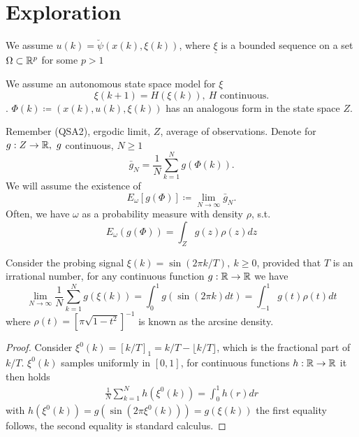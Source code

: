 
\section{Exploration}

We assume \(u(k)=\breve{\psi}(x(k),\xi(k))\), where \(\underline{\xi}\) is a 
bounded sequence on a set \(\Omega\subset \mathbb{R}^p\) for some \(p>1\)

We assume an autonomous state space model for \(\xi\) 
\[\xi(k+1)=H(\xi(k)),\ H \text{ continuous}.\].
\(\Phi(k)\coloneqq(x(k),u(k),\xi(k))\) has an analogous form in the state space \(Z\).

Remember (QSA2), ergodic limit, \(Z\), average of observations. Denote for 
\(g:Z\to\mathbb{R},\ g\) continuous, \(N\geq 1\)
\[\bar{g}_N=\frac{1}{N}\sum_{k=1}^N g(\Phi(k)).\]
We will assume the existence of 
\begin{equation}\label{eq:ergodic_mean}
    E_\omega\left[g(\Phi)\right]\coloneqq \lim_{N\to\infty} \bar{g}_N.
\end{equation}
Often, we have \(\omega\) as a probability measure with density \(\rho\), s.t. 
\[E_\omega(g(\Phi))=\int_Z g(z)\rho(z)dz \]

\begin{lemma}\label{lem:53}
Consider the probing signal \(\xi(k)=\sin(2\pi k/T),\ k\geq 0\), provided that \(T\) is 
an irrational number, for any continuous function \(g:\mathbb{R}\to\mathbb{R}\) we have 
\[\lim_{N\to\infty}\frac{1}{N}\sum_{k=1}^Ng(\xi(k))=\int_0^1g(\sin(2\pi k)dt)=\int_{-1}^1g (t)\rho(t)dt\]
where \(\rho(t)=\left[\pi\sqrt{1-t^2}\right]^{-1}\) is known as the arcsine density.    
\end{lemma}

\begin{proof}
    Consider \(\xi^0(k)=[k/T]_1=k/T-\lfloor k/T\rfloor\), which is the fractional part of \(k/T\).
    \(\xi^0(k)\) samples uniformly in \([0,1]\), for continuous functions \(h:\mathbb{R}\to\mathbb{R}\) it then holds 
    \begin{align*}
        \frac{1}{N}\sum_{k=1}^Nh(\xi^0(k))=\int_0^1 h(r)dr
    \end{align*}
    with \(h(\xi^0(k))=g(\sin(2\pi \xi^0(k)))=g(\xi(k))\) the first equality follows, the second equality is 
    standard calculus.
\end{proof}


